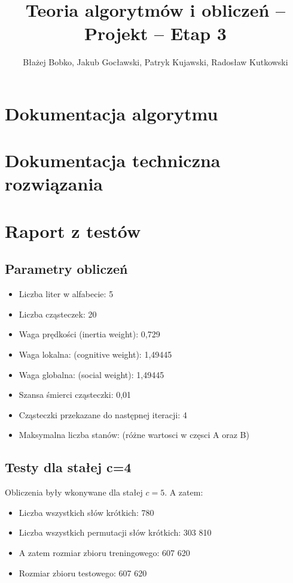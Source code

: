 \documentclass{../llncs_template_final/llncs}
\begin{document}
\title{Teoria algorytmów i obliczeń -- Projekt -- Etap 3}
\author{Błażej Bobko, Jakub Gocławski, Patryk Kujawski, Radosław Kutkowski}
\maketitle 

\section{Dokumentacja algorytmu}

\section{Dokumentacja techniczna rozwiązania}

\section{Raport z testów}

\subsection{Parametry obliczeń}

\begin{itemize}
\item Liczba liter w alfabecie: 5
\item Liczba cząsteczek: 20
\item Waga prędkości (inertia weight): 0,729
\item Waga lokalna: (cognitive weight): 1,49445
\item Waga globalna: (social weight): 1,49445	
\item Szansa śmierci cząsteczki: 0,01
\item Cząsteczki przekazane do następnej iteracji: 4
\item Maksymalna liczba stanów: (różne wartosci w częsci A oraz B)
\end{itemize}

\subsection{Testy dla stałej c=4}
Obliczenia były wkonywane dla stałej $c = 5$. A zatem:
\begin{itemize}
\item Liczba wszystkich słów krótkich: 780
\item Liczba wszystkich permutacji słów krótkich: 303 810
\item A zatem rozmiar zbioru treningowego: 607 620
\item Rozmiar zbioru testowego: 607 620
\end{itemize}
\end{document}
